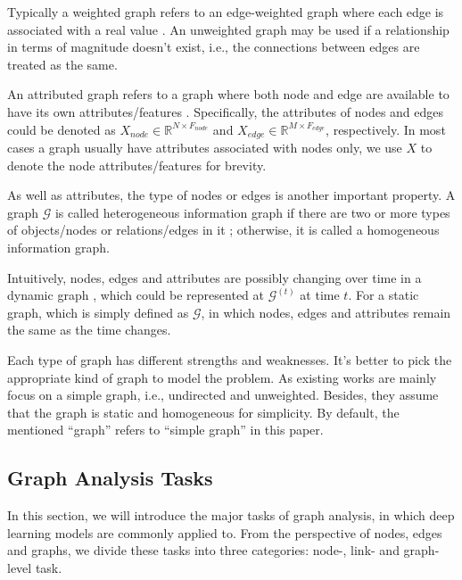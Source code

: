  Typically a weighted graph refers to an edge-weighted graph where each edge is associated with a real value \cite{chartrand1977introductory}. An unweighted graph may be used if a relationship in terms of magnitude doesn’t exist, i.e., the connections between edges are treated as the same.

An attributed graph refers to a graph where both node and edge are available to have its own attributes/features \cite{ding2019deep}. Specifically, the attributes of nodes and edges could be denoted as $X_{node} \in \mathbb{R}^{N\times F_{node}}$ and $X_{edge} \in \mathbb{R}^{M \times F_{edge}}$, respectively. In most cases a graph usually have attributes associated with nodes only, we use $X$ to denote the node attributes/features for brevity.

As well as attributes, the type of nodes or edges is another important property. A graph $\mathcal{G}$ is called heterogeneous information graph if there are two or more types of objects/nodes or relations/edges in it \cite{liu2018heterogeneous,hussein2018meta}; otherwise, it is called a homogeneous information graph.

Intuitively, nodes, edges and attributes are possibly changing over time in a dynamic graph \cite{manessi2020dynamic}, which could be represented at $\mathcal{G}^{(t)}$ at time $t$. For a static graph, which is simply defined as $\mathcal{G}$, in which nodes, edges and attributes remain the same as the time changes.

Each type of graph has different strengths and weaknesses. It's better to pick the appropriate kind of graph to model the problem. As existing works are mainly focus on a simple graph, i.e., undirected and unweighted. Besides, they assume that the graph is static and homogeneous for simplicity. By default, the mentioned ``graph'' refers to ``simple graph'' in this paper.

\subsection{Graph Analysis Tasks}
\label{task}
In this section, we will introduce the major tasks of graph analysis, in which deep learning models are commonly applied to. From the perspective of nodes, edges and graphs, we divide these tasks into three categories: node-, link- and graph-level task.

